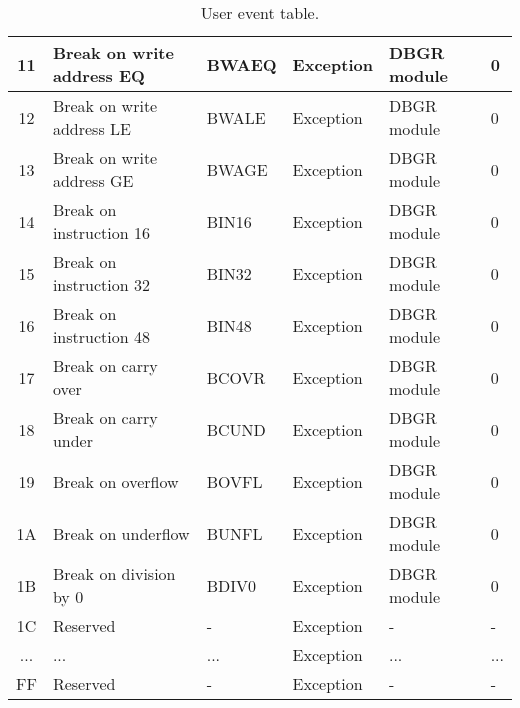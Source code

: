 \begin{table}[hbt!]
\begin{center}
\begin{tabular}{|c|l|l|l|l|l|}
        \hline
        11 & Break on write address EQ & BWAEQ & Exception & DBGR module & 0 \\
        \hline
        12 & Break on write address LE & BWALE & Exception & DBGR module & 0 \\
        \hline
        13 & Break on write address GE & BWAGE & Exception & DBGR module & 0 \\
        \hline
        14 & Break on instruction 16 & BIN16 & Exception & DBGR module & 0 \\
        \hline
        15 & Break on instruction 32 & BIN32 & Exception & DBGR module & 0 \\
        \hline
        16 & Break on instruction 48 & BIN48 & Exception & DBGR module & 0 \\
        \hline
        17 & Break on carry over & BCOVR & Exception & DBGR module & 0 \\
        \hline
        18 & Break on carry under & BCUND & Exception & DBGR module & 0 \\
        \hline
        19 & Break on overflow & BOVFL & Exception & DBGR module & 0 \\
        \hline
        1A & Break on underflow & BUNFL & Exception & DBGR module & 0 \\
        \hline
        1B & Break on division by 0 & BDIV0 & Exception & DBGR module & 0 \\
        \hline
        1C & Reserved & - & Exception & - & - \\
        \hline
        ... & ... & ... & Exception & ... & ... \\
        \hline
        FF & Reserved & - & Exception & - & - \\
        \hline

    \end{tabular}

    \caption[User event table]{User event table.}

    \end{center}

\end{table}